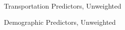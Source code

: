 \documentclass[12pt,a4paper]{article}
\begin{document}
\begin{table}[H]
	\begin{center}
		\caption{Transportation Predictors, Unweighted}
		
	\end{center}
\end{table}

\begin{table}[H]
	\begin{center}
		\caption{Demographic Predictors, Unweighted}
		
	\end{center}
\end{table}
\end{document}
